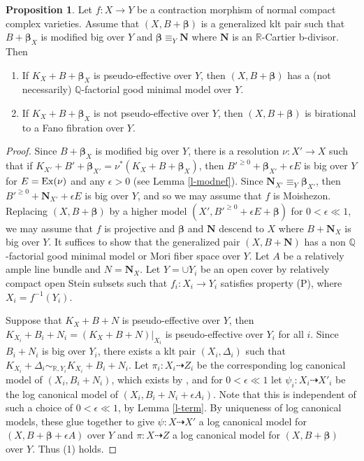 \documentclass[11pt]{amsart}
\numberwithin{equation}{section}
\def\bbeta{\boldsymbol{\beta}}
\newcommand\Q{{\mathbb{Q}}}
\newcommand\R{{\mathbb{R}}}
\theoremstyle{definition}
\theoremstyle{definition}
\newtheorem{proposition}[theorem]{Proposition}
\theoremstyle{definition}
\begin{document}
\begin{proposition}\label{p-relmmp} Let $f:X\to Y$ be a contraction morphism of normal compact complex varieties. Assume that $(X,B+\bbeta )$ is a generalized klt pair such that $B+\bbeta_X$ is modified big over $Y$ and $\bbeta \equiv _Y \mathbf N$ where $\mathbf N$ is an $\R$-Cartier b-divisor. Then
\begin{enumerate}\item If $K_X+B+\bbeta_X$ is pseudo-effective over $Y$, then $(X,B+\bbeta)$ has a (not necessarily) $\Q$-factorial good minimal model over $Y$.
\item  If $K_X+B+\bbeta_X$ is not pseudo-effective over $Y$, then $(X,B+\bbeta)$ is birational to a Fano fibration  over $Y$.
\end{enumerate}
\end{proposition}
\begin{proof}  %
Since $B+\bbeta _{X}$ is modified big over $Y$, there is a resolution $\nu :X'\to X$ such that if $K_{X'}+B'+\bbeta _{X'}=\nu^* (K_X+B+\bbeta _X)$, then $B'^{\geq 0}+\bbeta _{X'}+\epsilon E$ is big over $Y$ for  $E={\rm Ex}(\nu)$ and any $\epsilon >0$ (see Lemma \ref{l-modnef}).
Since $\mathbf N _{X'}\equiv_Y \bbeta _{X'}$, then $B'^{\geq 0}+\mathbf N _{X'}+\epsilon E$ is big over $Y$, and so we may assume that $f$ is Moishezon.
Replacing $(X,B+\bbeta )$ by a higher model $(X', B'^{\geq 0}+\epsilon E+\bbeta )$ for $0<\epsilon \ll 1$, we may assume that $f$ is projective and $\bbeta$ and $\mathbf N$ descend to $X$ where $B+\mathbf{N}_X$ is big over $Y$. It suffices to show that the generalized pair $(X,B+\mathbf{N})$ has a non $\Q$-factorial good minimal model or Mori fiber space over $Y$.  Let $A$
 be a relatively ample line bundle and ${N}=\mathbf{N} _X$. 
Let $Y=\cup Y_i$ be an open cover by relatively compact open Stein subsets such that $f_i:X_i\to Y_i$ satisfies property (P), where $X_i=f^{-1}(Y_i)$. 

Suppose that $K_X+B+N$ is pseudo-effective over $Y$, then $K_{X_i}+B_i+N_i=(K_X+B+N)|_{X_i}$ is pseudo-effective over $Y_i$ for all $i$. Since $B_i+N_i$ is big over $Y_i$,  there exists a klt pair $(X_i,\Delta_i)$ such that $K_{X_i}+\Delta _i\sim _{\R,Y_i} K_{X_i}+B_i+N_i$. Let $\pi_i:X_i\dasharrow Z_i$ be the corresponding log canonical model of $(X_i,B_i+N_i)$, which exists by \cite[Theorem 1.8]{Fuj22}, and for $0<\epsilon\ll1$ let $\psi_i:X_i\dasharrow X'_i$ be the log canonical model of $(X_i,B_i+N_i+\epsilon A_i)$. Note that this is independent of such a choice of $0<\epsilon\ll 1$, by Lemma \ref{l-term}. 
By uniqueness of log canonical models, these glue together to give $\psi :X\dasharrow X'$ a log canonical model for $(X,B+\bbeta+\epsilon A)$ over $Y$ and $\pi:X\dasharrow Z$ a log canonical model for $(X,B+\bbeta)$ over $Y$. Thus (1) holds. 


\end{proof}
\end{document}
